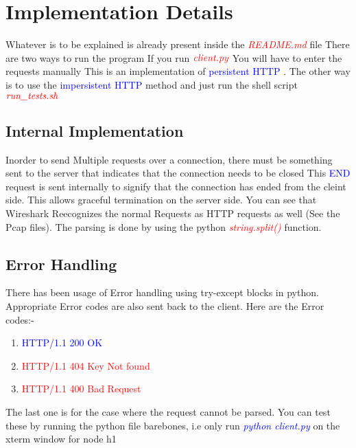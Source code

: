 \section{Implementation Details}
Whatever is to be explained is already present inside the \textit{\textcolor{red}{README.md}} file
There are two ways to run the program If you run $\textit{\textcolor{red}{client.py }} $You will have to enter the requests manually This is an implementation of \textcolor{blue}{persistent HTTP} . 
The other way is to use the \textcolor{blue}{impersistent HTTP} method
and just run the shell script $\textit{\textcolor{red}{run\_tests.sh }}$

\subsection{Internal Implementation}
Inorder to send Multiple requests over a connection, there must be something sent to the server that indicates that the connection needs to be closed
This \textcolor{blue}{END} request is sent internally to signify that the connection has ended from the cleint side. This allows graceful termination on
the server side. You can see that Wireshark Reecognizes the normal Requests as HTTP requests as well (See the Pcap files).
The parsing is done by using the python \textit{\textcolor{red}{string.split()}} function.

\subsection{Error Handling}
There has been usage of Error handling using try-except blocks in python. Appropriate Error codes are also sent back to the client.
Here are the Error codes:-
\begin{enumerate}
    \item \textcolor{blue}{HTTP/1.1 200 OK} 
    \item \textcolor{red}{HTTP/1.1 404 Key Not found}
    \item \textcolor{red}{HTTP/1.1 400 Bad Request}

\end{enumerate}


The last one is for the case where the request cannot be parsed. You can test these by running the python file barebones, i.e only run 
\textit{\textcolor{blue}{python client.py}} on the xterm window for node h1\\
\